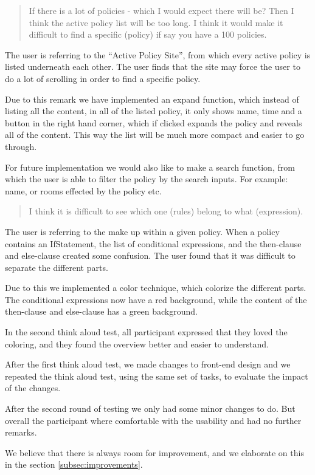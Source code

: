 \begin{quotation}
If there is a lot of policies - which I would expect there will be? Then I think the active policy list will be too long. I think it would make it difficult to find a specific (policy) if say you have a 100 policies.
\end{quotation}

The user is referring to the “Active Policy Site”, from which every active policy is listed underneath each other. The user finds that the site may force the user to do a lot of scrolling in order to find a specific policy.

Due to this remark we have implemented an expand function, which instead of listing all the content, in all of the listed policy, it only shows name, time and a button in the right hand corner, which if clicked expands the policy and reveals all of the content. This way the list will be much more compact and easier to go through. 

For future implementation we would also like to make a search function, from which the user is able to filter the policy by the search inputs. For example: name, or rooms effected  by the policy etc.
 
\begin{quotation}
I think it is difficult to see which one (rules) belong to what (expression).
\end{quotation}

The user is referring to the make up within a given policy. When a policy contains an IfStatement, the list of conditional expressions, and the then-clause and else-clause created some confusion. The user found that it was difficult to separate the different parts.

Due to this we implemented a color technique, which colorize the different parts. The conditional expressions now have a red background, while the content of the then-clause and else-clause has a green background.

In the second think aloud test, all participant expressed that they loved the coloring, and they found the overview better and easier to understand.

After the first think aloud test, we made changes to front-end design and we repeated the think aloud test, using the same set of tasks, to evaluate the impact of the changes.

After the second round of testing we only had some minor changes to do. But overall the participant where comfortable with the usability and had no further remarks.

We believe that there is always room for improvement, and we elaborate on this in the section \ref{subsec:improvements}.
